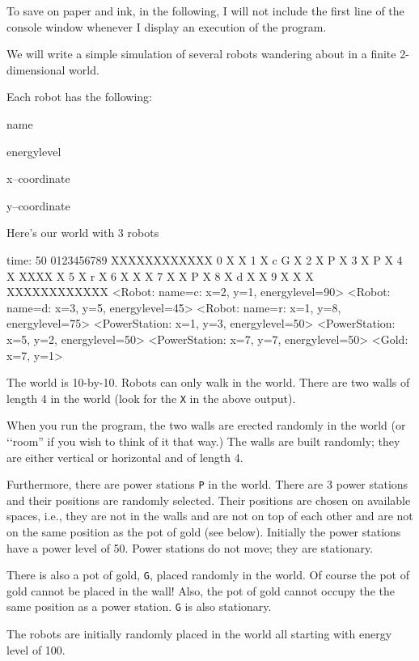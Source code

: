To save on paper and ink, in the following,
I will not include the first line of the console
window whenever I display an execution of the program.


\newpage

We will write a simple simulation of several robots wandering about in a
finite 2-dimensional world.

Each robot has the following:
\begin{tightlist}
\item name
\item energylevel
\item x--coordinate
\item y--coordinate
\end{tightlist}
Here's our world with 3 robots
\begin{console}
time: 50
   0123456789
  XXXXXXXXXXXX
0 X          X
1 X  c    G  X
2 X     P    X
3 X P        X
4 X   XXXX   X
5 X   r      X
6 X   X      X
7 X   X   P  X
8 X d X      X
9 X   X      X
  XXXXXXXXXXXX
<Robot: name=c: x=2, y=1, energylevel=90>
<Robot: name=d: x=3, y=5, energylevel=45>
<Robot: name=r: x=1, y=8, energylevel=75>
<PowerStation: x=1, y=3, energylevel=50>
<PowerStation: x=5, y=2, energylevel=50>
<PowerStation: x=7, y=7, energylevel=50>
<Gold: x=7, y=1>
\end{console}
The world is 10-by-10.
Robots can only walk in the world.
There are two walls of length 4 in the world (look for the
\verb!X! in the above output).

When you run the program,
the two walls are erected randomly in the world (or \lq\lq room'' if you
wish to think of it that way.)
The walls are built randomly; they are either vertical or 
horizontal and of length 4.

Furthermore, there are power stations \verb!P! in the world.
There are 3 power stations and their positions are randomly selected.
Their positions are chosen on available spaces, i.e., they
are not in the walls and are not on top of each other and are not
on the same position as the pot of gold (see below).
Initially the power stations have a power level of 50.
Power stations do not move; they are stationary.

There is also a pot of gold, \verb!G!, placed randomly in the world.
Of course the pot of gold cannot be placed in the wall!
Also, the pot of gold cannot occupy the the same position as a power station.
\verb!G! is also stationary.

The robots are initially randomly placed in the world all starting
with energy level of 100.

